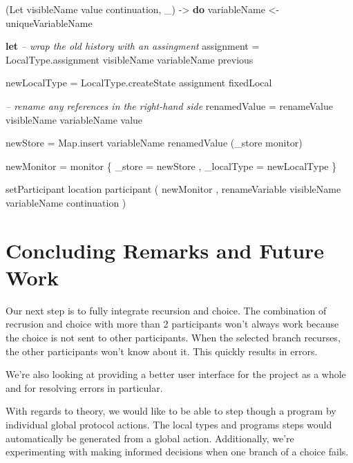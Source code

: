 \documentclass[runningheads]{llncs}
\newenvironment{Shaded}{}{}
\newcommand{\KeywordTok}[1]{\textcolor[rgb]{0.00,0.44,0.13}{\textbf{#1}}}
\newcommand{\DataTypeTok}[1]{\textcolor[rgb]{0.56,0.13,0.00}{#1}}
\newcommand{\CommentTok}[1]{\textcolor[rgb]{0.38,0.63,0.69}{\textit{#1}}}
\newcommand{\OtherTok}[1]{\textcolor[rgb]{0.00,0.44,0.13}{#1}}
\newcommand{\FunctionTok}[1]{\textcolor[rgb]{0.02,0.16,0.49}{#1}}
\newcommand{\NormalTok}[1]{#1}
\begin{document}
\begin{Shaded}
\begin{Highlighting}[]
\NormalTok{(}\DataTypeTok{Let}\NormalTok{ visibleName value continuation, _) }\OtherTok{->} \KeywordTok{do}
\NormalTok{    variableName }\OtherTok{<-}\NormalTok{ uniqueVariableName }

    \KeywordTok{let} 
        \CommentTok{-- wrap the old history with an assingment}
\NormalTok{        assignment }\FunctionTok{=} 
\NormalTok{            LocalType.assignment visibleName variableName previous}

\NormalTok{        newLocalType }\FunctionTok{=} 
\NormalTok{            LocalType.createState assignment fixedLocal}

        \CommentTok{-- rename any references in the right-hand side}
\NormalTok{        renamedValue }\FunctionTok{=}\NormalTok{ renameValue visibleName variableName value}

\NormalTok{        newStore }\FunctionTok{=} 
\NormalTok{            Map.insert variableName renamedValue (_store monitor)}

\NormalTok{        newMonitor }\FunctionTok{=}\NormalTok{ monitor }
\NormalTok{            \{ _store }\FunctionTok{=}\NormalTok{ newStore}
\NormalTok{            , _localType }\FunctionTok{=}\NormalTok{ newLocalType }
\NormalTok{            \}  }
    
\NormalTok{    setParticipant location participant }
\NormalTok{        ( newMonitor}
\NormalTok{        , renameVariable visibleName variableName continuation }
\NormalTok{        )}
\end{Highlighting}
\end{Shaded}



\section{Concluding Remarks and Future
Work}\label{concluding-remarks-and-future-work}

Our next step is to fully integrate recursion and choice. The
combination of recrusion and choice with more than 2 participants won't
always work because the choice is not sent to other participants. When
the selected branch recurses, the other participants won't know about
it. This quickly results in errors.

We're also looking at providing a better user interface for the project
as a whole and for resolving errors in particular.

With regards to theory, we would like to be able to step though a
program by individual global protocol actions. The local types and
programs steps would automatically be generated from a global action.
Additionally, we're experimenting with making informed decisions when
one branch of a choice fails.
%
%
%
% 
 
 
%
\end{document}
